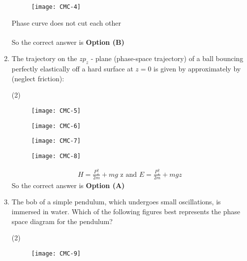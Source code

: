 \begin{enumerate}
\begin{tasks}
\begin{figure}[H]
\end{figure}
\task[\textbf{D.}] \begin{figure}[H]
	\centering
	\texttt{[image: CMC-4]}
\end{figure}
\end{tasks}
\begin{answer}
Phase curve does not cut each other\\\\
So the correct answer is \textbf{Option (B)}
\end{answer}
\item The trajectory on the $z p_{z}$ - plane (phase-space trajectory) of a ball bouncing perfectly elastically off a hard surface at $z=0$ is given by approximately by (neglect {friction):
	}
\begin{tasks}(2)
\task[\textbf{A.}] \begin{figure}[H]
	\centering
	\texttt{[image: CMC-5]}
\end{figure}
\task[\textbf{B.}] \begin{figure}[H]
	\centering
	\texttt{[image: CMC-6]}
\end{figure}
\task[\textbf{C.}] \begin{figure}[H]
	\centering
	\texttt{[image: CMC-7]}
\end{figure}
\task[\textbf{D.}] \begin{figure}[H]
	\centering
	\texttt{[image: CMC-8]}
\end{figure}
\end{tasks}
\begin{answer}
\begin{align*}
H=\frac{P_{z}^{2}}{2 m}+m g\text{ z and }E=\frac{P_{z}^{2}}{2 m}+m g z
\end{align*}
So the correct answer is \textbf{Option (A)}	
\end{answer}
\item The bob of a simple pendulum, which undergoes small oscillations, is immersed in water. Which of the following figures best represents the phase space diagram for the pendulum?
{}
\begin{tasks}(2)
\task[\textbf{A.}] \begin{figure}[H]
	\centering
	\texttt{[image: CMC-9]}
\end{figure}
\task[\textbf{B.}] \begin{figure}[H]

\end{figure}
\end{tasks}
\end{enumerate}
